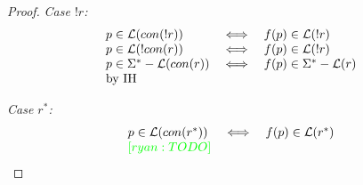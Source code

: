 \documentclass[twocolumn]{sig-alternate-10pt}
\newcommand{\ryan}[1]{\textcolor{green}{[ryan: #1]}}
\newtheorem{defn}{Definition}
\newtheorem{lem}[thm]{Lemma}
\begin{document}
\begin{proof}
\emph{Case $!r$:}
  \[ \begin{array}{lll}
    p \in \mathcal{L}(con(!r)) &\iff& f(p) \in \mathcal{L}(!r) \\
    p \in \mathcal{L}(!con(r)) &\iff& f(p) \in \mathcal{L}(!r) \\
    p \in \Sigma^* - \mathcal{L}(con(r)) &\iff& f(p) \in \Sigma^* - \mathcal{L}(r) \\
    \text{by IH} & & \\
  \end{array} \]

\emph{Case $r^*$:}
  \[ \begin{array}{lll}
    p \in \Lang(con(r^*)) &\iff& f(p) \in \Lang(r^*) \\
    \ryan{TODO} & & \\
  \end{array} \]

\end{proof}






%





%
\end{document}
